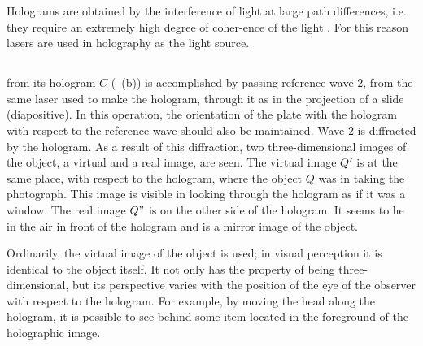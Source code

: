 Holograms are obtained by the interference of light at large path differences, i.e. they require an extremely high degree of coher-ence of the light . For this reason lasers  are used in holography as the light source.

\subsection{}\label{33.6.2}  from its hologram $C$ (~{(b)}) is accomplished by passing reference wave  $\mathit{2}$, from the same laser used to make the hologram, through it as in the projection of a slide (diapositive). In this operation, the
orientation of the plate with the hologram with respect to the reference wave should also be maintained. Wave  $\mathit{2}$ is diffracted by the hologram. As a result of this diffraction, two three-dimensional images of the object, a virtual and a real image, are seen. The virtual image $Q'$ is at the same place, with respect to the hologram, where the object $Q$ was in taking the photograph. This image is visible in looking through the hologram as if it was a window. The real image $Q"$ is on the other side of the hologram. It seems to he in the air in front of the hologram and
is a mirror image of the object.

Ordinarily, the virtual image of the object is used; in visual
perception it is identical to the object itself. It not only has the property of being three-dimensional, but its perspective varies with the position of the eye of the observer with respect to the hologram. For example, by moving the head along the hologram, it is possible to see behind some item located in the foreground of the holographic image.


